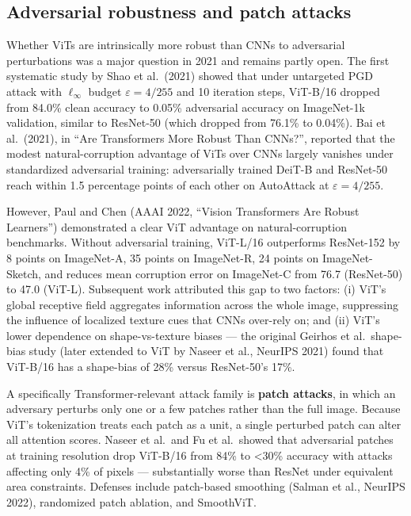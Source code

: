 \subsection{Adversarial robustness and patch attacks}\label{adversarial-robustness-and-patch-attacks}

Whether ViTs are intrinsically more robust than CNNs to adversarial perturbations was a major question in 2021 and remains partly open. The first systematic study by Shao et al.~(2021) showed that under untargeted PGD attack with \(\ell_\infty\) budget \(\varepsilon = 4/255\) and 10 iteration steps, ViT-B/16 dropped from 84.0\% clean accuracy to 0.05\% adversarial accuracy on ImageNet-1k validation, similar to ResNet-50 (which dropped from 76.1\% to 0.04\%). Bai et al.~(2021), in ``Are Transformers More Robust Than CNNs?'', reported that the modest natural-corruption advantage of ViTs over CNNs largely vanishes under standardized adversarial training: adversarially trained DeiT-B and ResNet-50 reach within 1.5 percentage points of each other on AutoAttack at \(\varepsilon = 4/255\).

However, Paul and Chen (AAAI 2022, ``Vision Transformers Are Robust Learners'') demonstrated a clear ViT advantage on natural-corruption benchmarks. Without adversarial training, ViT-L/16 outperforms ResNet-152 by 8 points on ImageNet-A, 35 points on ImageNet-R, 24 points on ImageNet-Sketch, and reduces mean corruption error on ImageNet-C from 76.7 (ResNet-50) to 47.0 (ViT-L). Subsequent work attributed this gap to two factors: (i) ViT's global receptive field aggregates information across the whole image, suppressing the influence of localized texture cues that CNNs over-rely on; and (ii) ViT's lower dependence on shape-vs-texture biases --- the original Geirhos et al.~shape-bias study (later extended to ViT by Naseer et al., NeurIPS 2021) found that ViT-B/16 has a shape-bias of 28\% versus ResNet-50's 17\%.

A specifically Transformer-relevant attack family is \textbf{patch attacks}, in which an adversary perturbs only one or a few patches rather than the full image. Because ViT's tokenization treats each patch as a unit, a single perturbed patch can alter all attention scores. Naseer et al.~and Fu et al.~showed that adversarial patches at training resolution drop ViT-B/16 from 84\% to \textless30\% accuracy with attacks affecting only 4\% of pixels --- substantially worse than ResNet under equivalent area constraints. Defenses include patch-based smoothing (Salman et al., NeurIPS 2022), randomized patch ablation, and SmoothViT.

